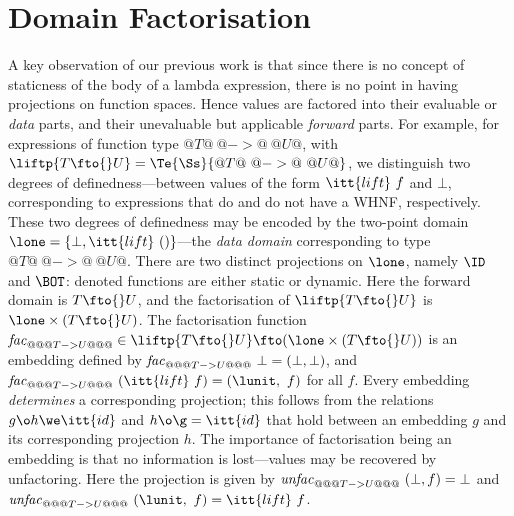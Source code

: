 \documentclass[11pt]{article}
\begin{document}
\section{Domain Factorisation}

A key observation of our previous work
\cite{Dav93b} is that since there is no concept
of staticness of the body of a lambda expression, there is no point in
having projections on function spaces.  Hence values are factored into
their evaluable or {\it data\/} parts, and their unevaluable but
applicable {\it forward\/} parts.  For example, for expressions of
function type ${@T@\ @->@\ @U@}$, with
$\liftp{T\fto{}U}=\Te{\Ss}{@T@\ @->@\ @U@}$, we distinguish two
degrees of definedness---between values of the form
$\itt{lift}~f$ and $\bot$, corresponding to expressions that do and
do not have a WHNF, respectively.  These two degrees of definedness 
may be encoded by the two-point
domain $\lone=\{\bot, \itt{lift}~()\}$---the {\it data domain\/} corresponding
to type ${@T@\ @->@\ @U@}$.  There are two distinct projections on $\lone$,
namely $\ID$ and $\BOT$: denoted functions are 
either static or dynamic.  Here 
the forward domain is $T\fto{}U$, and the factorisation of $\liftp{T\fto{}U}$
is $\lone\times(T\fto{}U)$.  The factorisation function
${\it{}fac}_{@@@T->U@@@}\in\liftp{T\fto{}U}\fto(\lone\times(T\fto{}U))$
is an embedding defined by
${\it{}fac}_{@@@T->U@@@}~\bot=(\bot,\bot)$, and
${\it{}fac}_{@@@T->U@@@}~(\itt{lift}~f)=(\lunit,~f)$ for all $f$.
Every embedding {\it determines\/} a corresponding projection; 
this follows from the relations $g\o h\we\itt{id}$ and $h\o\g=\itt{id}$
that hold between an embedding $g$ and its corresponding projection $h$.
The importance of factorisation being an embedding is that no information
is lost---values may be recovered by unfactoring.  Here the
projection is given by
${\it{}unfac}_{@@@T->U@@@}~(\bot,f)=\bot$ and
${\it{}unfac}_{@@@T->U@@@}~(\lunit,~f)=\itt{lift}~f$.
\end{document}

